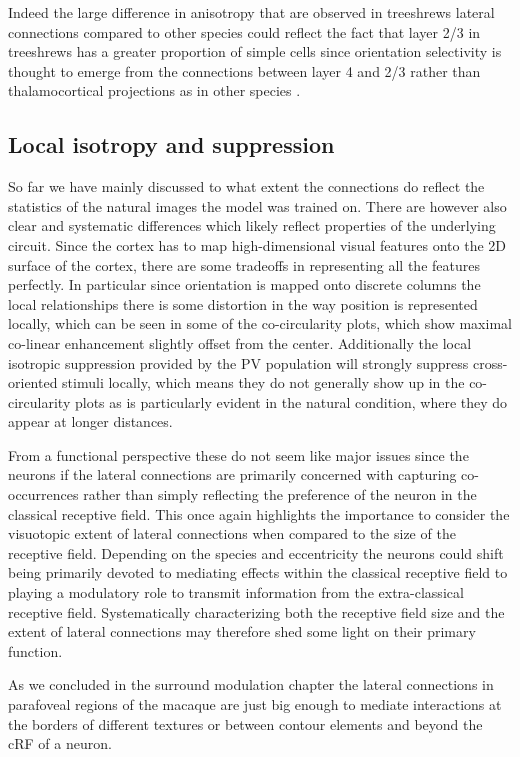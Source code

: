 Indeed the large difference in anisotropy that are observed in
treeshrews lateral connections compared to other species could reflect
the fact that layer 2/3 in treeshrews has a greater proportion of
simple cells since orientation selectivity is thought to emerge from
the connections between layer 4 and 2/3 rather than thalamocortical
projections as in other species \citep{VanHooser2013}.

\subsection{Local isotropy and suppression}

So far we have mainly discussed to what extent the connections do
reflect the statistics of the natural images the model was trained
on. There are however also clear and systematic differences which
likely reflect properties of the underlying circuit. Since the cortex
has to map high-dimensional visual features onto the 2D surface of the
cortex, there are some tradeoffs in representing all the features
perfectly. In particular since orientation is mapped onto discrete
columns the local relationships there is some distortion in the way
position is represented locally, which can be seen in some of the
co-circularity plots, which show maximal co-linear enhancement
slightly offset from the center. Additionally the local isotropic
suppression provided by the PV population will strongly suppress
cross-oriented stimuli locally, which means they do not generally show
up in the co-circularity plots as is particularly evident in the
natural condition, where they do appear at longer distances.

From a functional perspective these do not seem like major issues
since the neurons if the lateral connections are primarily concerned
with capturing co-occurrences rather than simply reflecting the
preference of the neuron in the classical receptive field. This once
again highlights the importance to consider the visuotopic extent of
lateral connections when compared to the size of the receptive
field. Depending on the species and eccentricity the neurons could
shift being primarily devoted to mediating effects within the
classical receptive field to playing a modulatory role to transmit
information from the extra-classical receptive field. Systematically
characterizing both the receptive field size and the extent of lateral
connections may therefore shed some light on their primary function.

As we concluded in the surround modulation chapter the lateral
connections in parafoveal regions of the macaque are just big enough
to mediate interactions at the borders of different textures or
between contour elements and beyond the cRF of a neuron.


